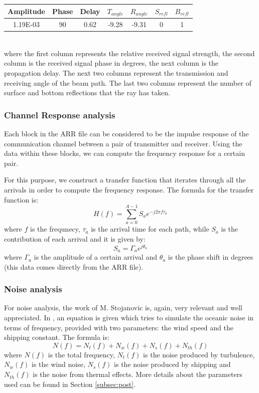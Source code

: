 \documentclass[a4paper]{IEEEtran}
\begin{document}
\hspace{-0.5cm}
\begin{tabular}{|c|c|c|c|c|c|c|}
\hline
Amplitude&Phase&Delay&$T_{angle}$&$R_{angle}$&$S_{refl}$&$B_{refl}$\\ \hline
1.19E-03 & 90 & 0.62 & -9.28 & -9.31 &0 &1\\
\hline
\end{tabular}\\

where the first column represents the relative received signal
strength, the second column is the received signal phase in degrees,
the next column is the propagation delay. The next two columns
represent the transmission and receiving angle of the beam path. The
last two columns represent the number of surface and bottom
reflections that the ray has taken.
\subsubsection{Channel Response analysis}
Each block in the ARR file can be considered to be the impulse
response of the communication channel between a pair of transmitter
and receiver. Using the data within these blocks, we can compute the
frequency response for a certain pair.

For this purpose, we construct a transfer function that iterates
through all the arrivals in order to compute the frequency
response. The formula for the transfer function is: $$H(f) =
\sum\limits_{a=0}^{A-1}S_a e^{-j 2 \pi f \tau_{a}}$$ where $f$ is the
frequnecy, $\tau_a$ is the arrival time for each path, while $S_a$ is
the contribution of each arrival and it is given by:$$S_a = \Gamma_a
e^{j \theta_a}$$ where $\Gamma_a$ is the amplitude of a certain arrival
and $\theta_a$ is the phase shift in degrees (this data comes directly
from the ARR file).

\subsubsection{Noise analysis}

For noise analysis, the work of M. Stojanovic is, again, very relevant
and well appreciated. In \cite{stojanovic}, an equation is given which
tries to simulate the oceanic noise in terms of frequency, provided
with two parameters: the wind speed and the shipping constant. The
formula is:$$N(f) = N_t(f) + N_w(f) + N_s(f) + N_{th}(f)$$ where
$N(f)$ is the total frequency, $N_t(f)$ is the noise produced by
turbulence, $N_w(f)$ is the wind noise, $N_s(f)$ is the noise produced
by shipping and $N_{th}(f)$ is the noise from thermal effects. More
details about the parameters used can be found in Section
\ref{subsec:post}. 
\end{document}
